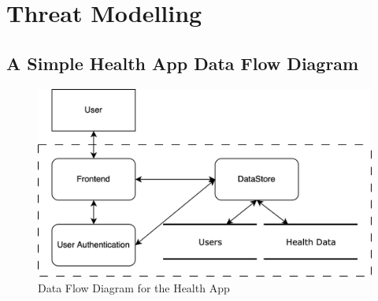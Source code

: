 \section{Threat Modelling}
\label{sec:threat-modelling}

\subsection{A Simple Health App Data Flow Diagram}
\begin{figure}[H]
  \caption{Data Flow Diagram for the Health App}
  \vspace*{1em}
  \begin{center}
    \includegraphics[width=\textwidth]{Diagrams/threat-modelling-1.png}
  \end{center}
\end{figure}
